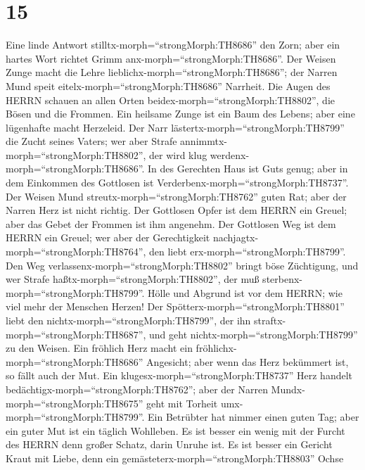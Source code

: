 \hypertarget{section-14}{%
\section{15}\label{section-14}}

 Eine linde Antwort stilltx-morph=``strongMorph:TH8686'' den
Zorn; aber ein hartes Wort richtet Grimm
anx-morph=``strongMorph:TH8686''.  Der Weisen Zunge macht
die Lehre lieblichx-morph=``strongMorph:TH8686''; der Narren Mund speit
eitelx-morph=``strongMorph:TH8686'' Narrheit.  Die Augen des
HERRN schauen an allen Orten beidex-morph=``strongMorph:TH8802'', die
Bösen und die Frommen.  Ein heilsame Zunge ist ein Baum des
Lebens; aber eine lügenhafte macht Herzeleid.  Der Narr
lästertx-morph=``strongMorph:TH8799'' die Zucht seines Vaters; wer aber
Strafe annimmtx-morph=``strongMorph:TH8802'', der wird klug
werdenx-morph=``strongMorph:TH8686''.  In des Gerechten Haus
ist Guts genug; aber in dem Einkommen des Gottlosen ist
Verderbenx-morph=``strongMorph:TH8737''.  Der Weisen Mund
streutx-morph=``strongMorph:TH8762'' guten Rat; aber der Narren Herz ist
nicht richtig.  Der Gottlosen Opfer ist dem HERRN ein
Greuel; aber das Gebet der Frommen ist ihm angenehm.  Der
Gottlosen Weg ist dem HERRN ein Greuel; wer aber der Gerechtigkeit
nachjagtx-morph=``strongMorph:TH8764'', den liebt
erx-morph=``strongMorph:TH8799''.  Den Weg
verlassenx-morph=``strongMorph:TH8802'' bringt böse Züchtigung, und wer
Strafe haßtx-morph=``strongMorph:TH8802'', der muß
sterbenx-morph=``strongMorph:TH8799''.  Hölle und Abgrund
ist vor dem HERRN; wie viel mehr der Menschen Herzen!  Der
Spötterx-morph=``strongMorph:TH8801'' liebt den
nichtx-morph=``strongMorph:TH8799'', der ihn
straftx-morph=``strongMorph:TH8687'', und geht
nichtx-morph=``strongMorph:TH8799'' zu den Weisen.  Ein
fröhlich Herz macht ein fröhlichx-morph=``strongMorph:TH8686''
Angesicht; aber wenn das Herz bekümmert ist, so fällt auch der Mut.
 Ein klugesx-morph=``strongMorph:TH8737'' Herz handelt
bedächtigx-morph=``strongMorph:TH8762''; aber der Narren
Mundx-morph=``strongMorph:TH8675'' geht mit Torheit
umx-morph=``strongMorph:TH8799''.  Ein Betrübter hat nimmer
einen guten Tag; aber ein guter Mut ist ein täglich Wohlleben.
 Es ist besser ein wenig mit der Furcht des HERRN denn
großer Schatz, darin Unruhe ist.  Es ist besser ein Gericht
Kraut mit Liebe, denn ein gemästeterx-morph=``strongMorph:TH8803'' Ochse
